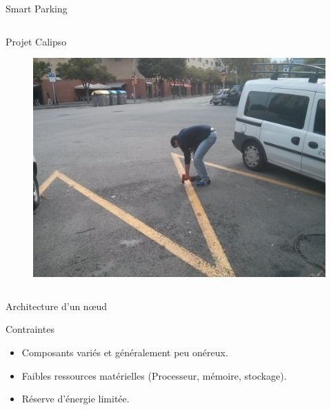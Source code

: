 \begin{frame}{Smart Parking}
\begin{columns}
\begin{column}{0.48\textwidth}
\begin{alertblock}{Projet Calipso}
\begin{itemize}
          \end{itemize}
        \end{alertblock}
        \begin{figure}
          \centering
          \includegraphics[width=.7\textwidth]{figures/installation_smart_parking.jpg}
        \end{figure}
      \end{column}
  \end{columns}
\end{frame}

\begin{frame}{Architecture d'un nœud}
  \begin{figure}
    \centering
    
  \end{figure}
  \begin{block}{Contraintes}
    \begin{itemize}
      \item Composants variés et généralement peu onéreux.
      \item Faibles ressources matérielles (Processeur, mémoire, stockage).
      \item Réserve d'énergie limitée.
    \end{itemize}
  \end{block}
\end{frame}

